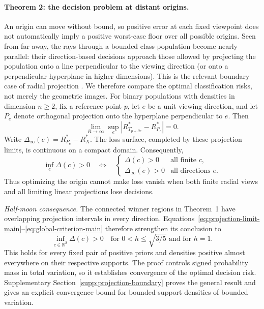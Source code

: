 \paragraph{Theorem 2: the decision problem at distant origins.}
An origin can move without bound, so positive error at each fixed viewpoint does not automatically imply a positive worst-case floor over all possible origins. Seen from far away, the rays through a bounded class population become nearly parallel: their direction-based decisions approach those allowed by projecting the population onto a line perpendicular to the viewing direction (or onto a perpendicular hyperplane in higher dimensions). This is the relevant boundary case of radial projection \citep{Orponen2019}. We therefore compare the optimal classification risks, not merely the geometric images. For binary populations with densities in dimension $n\geq2$, fix a reference point $p$, let $e$ be a unit viewing direction, and let $P_e$ denote orthogonal projection onto the hyperplane perpendicular to $e$. Then
\begin{equation}
 \lim_{R\to\infty}\sup_e
 \left|R^*_{T_{p+Re}}-R^*_{P_e}\right|=0.
 \label{eq:projection-limit-main}
\end{equation}
Write $\Delta_\infty(e)=R^*_{P_e}-R_X^*$. The loss surface, completed by these projection limits, is continuous on a compact domain. Consequently,
\begin{equation}
 \inf_c\Delta(c)>0
 \quad\Longleftrightarrow\quad
 \begin{cases}
 \Delta(c)>0&\text{all finite }c,\\
 \Delta_\infty(e)>0&\text{all directions }e.
 \end{cases}
 \label{eq:global-criterion-main}
\end{equation}
Thus optimizing the origin cannot make loss vanish when both finite radial views and all limiting linear projections lose decisions.

\emph{Half-moon consequence.}
The connected winner regions in Theorem~1 have overlapping projection intervals in every direction. Equations~\eqref{eq:projection-limit-main}--\eqref{eq:global-criterion-main} therefore strengthen its conclusion to
\begin{equation}
 \inf_{c\in\mathbb R^2}\Delta(c)>0
 \quad\text{for }0<h\leq\sqrt{3/5}\text{ and for }h=1.
 \label{eq:global-positive}
\end{equation}
This holds for every fixed pair of positive priors and densities positive almost everywhere on their respective supports. The proof controls signed probability mass in total variation, so it establishes convergence of the optimal decision risk. Supplementary Section~\ref{supp:projection-boundary} proves the general result and gives an explicit convergence bound for bounded-support densities of bounded variation.


